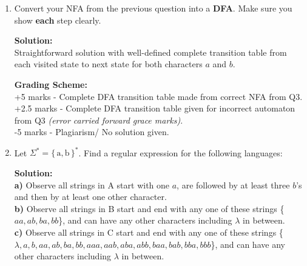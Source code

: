\documentclass[11pt, article, oneside]{memoir}
\newcommand{\set}[1]{\{\, #1\, \}}
\DeclarePairedDelimiter\abs{\lvert}{\rvert}
\begin{document}
\begin{enumerate}
    \item
        Convert your NFA from the previous question into a \textbf{DFA}. Make sure you show \textbf{each} step clearly.

        \textbf{Solution:}
        \\Straightforward solution with well-defined complete transition table from each visited state to next state for both characters \(a\) and \(b\).

        \textbf{Grading Scheme:}
        \\+5 marks - Complete DFA transition table made from correct NFA from Q3.
        \\+2.5 marks - Complete DFA transition table given for incorrect automaton from Q3 \textit{(error carried forward grace marks)}.
        \\-5 marks -  Plagiarism/ No solution given.
        
    \item
        Let \(\Sigma^* = \set{\text{a}, \text{b}}^*\). Find a regular expression for the following languages:

        \textbf{Solution:}
        \\\textbf{a)} Observe all strings in A start with one \(a\), are followed by at least three \(b\)'s and then by at least one other character.
        \\\textbf{b)} Observe all strings in B start and end with any one of these strings \{\(aa, ab, ba, bb\)\}, and can have any other characters including \(\lambda\) in between.
        \\\textbf{c)} Observe all strings in C start and end with any one of these strings \{\(\lambda, a, b, aa, ab, ba, bb, aaa, aab, aba, abb, baa, bab, bba, bbb\)\}, and can have any other characters including \(\lambda\) in between.


\end{enumerate}
\end{document}
